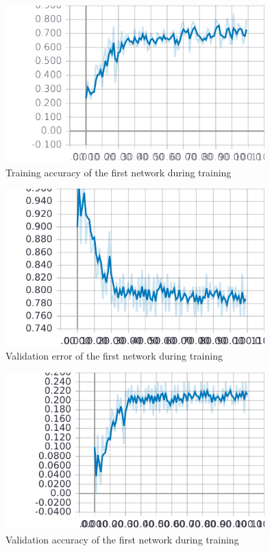 \documentclass[
        a4paper,
        10pt,
        parskip = full,    %
    ]{scrartcl}
\begin{document}
\begin{figure}[H]
  \begin{center}
    \includegraphics[width=10cm]{../images/train_accuracy.pdf}
    \caption{Training accuracy of the first network during training}
    \label{Learning measurements}
  \end{center}
\end{figure}

\begin{figure}[H]
  \begin{center}
    \includegraphics[width=10cm]{../images/valid_error.pdf}
    \caption{Validation error of the first network during training}
    \label{Learning measurements}
  \end{center}
\end{figure}

\begin{figure}[H]
  \begin{center}
    \includegraphics[width=10cm]{../images/valid_accuracy.pdf}
    \caption{Validation accuracy of the first network during training}
    \label{Learning measurements}
  \end{center}
\end{figure}
\end{document}
